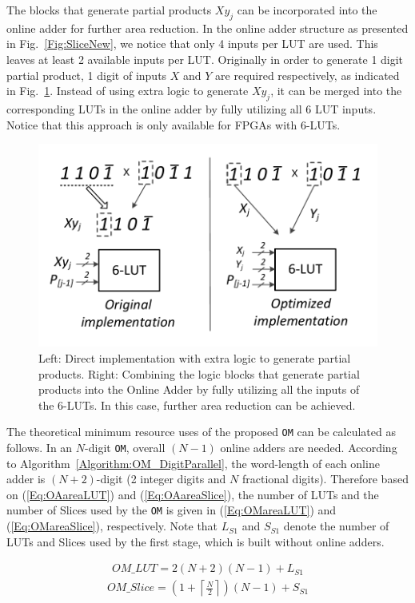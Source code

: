 \documentclass[conference]{IEEEtran}
\begin{document}
The blocks that generate partial products $Xy_j$ can be incorporated into the online adder for further area reduction. In the online adder structure as presented in Fig.~\ref{Fig:SliceNew}, we notice that only 4 inputs per LUT are used. This leaves at least 2 available inputs per LUT. Originally in order to generate 1 digit partial product, 1 digit of inputs $X$ and $Y$ are required respectively, as indicated in Fig.~\ref{Fig:PartialProduct}. Instead of using extra logic to generate $Xy_j$, it can be merged into the corresponding LUTs in the online adder by fully utilizing all 6 LUT inputs. Notice that this approach is only available for FPGAs with 6-LUTs.
%
\begin{figure}[tbp]
	\centering
	\includegraphics[width=.4\textwidth]{./Figures/PartialProduct.pdf}
	\vspace{-1ex}
	\caption{Left: Direct implementation with extra logic to generate partial products. Right: Combining the logic blocks that generate partial products into the Online Adder by fully utilizing all the inputs of the 6-LUTs. In this case, further area reduction can be achieved.}
	\label{Fig:PartialProduct}
	\vspace{-1ex}
\end{figure}

The theoretical minimum resource uses of the proposed \texttt{OM} can be calculated as follows. In an $N$-digit \texttt{OM}, overall $(N-1)$ online adders are needed. According to Algorithm~\ref{Algorithm:OM_DigitParallel}, the word-length of each online adder is $(N+2)$-digit (2 integer digits and $N$ fractional digits). Therefore based on (\ref{Eq:OAareaLUT}) and (\ref{Eq:OAareaSlice}), the number of LUTs and the number of Slices used by the \texttt{OM} is given in (\ref{Eq:OMareaLUT}) and (\ref{Eq:OMareaSlice}), respectively. Note that $L_{S1}$ and $S_{S1}$ denote the number of LUTs and Slices used by the first stage, which is built without online adders.

\begin{eqnarray}\label{Eq:OMareaLUT}
	OM\_{LUT} = 2(N+2)(N-1) + {L}_{S1}
\end{eqnarray}
%
\begin{eqnarray}\label{Eq:OMareaSlice}
	OM\_{Slice} = (1+\left\lceil{\frac{N}{2}}\right\rceil)(N-1)+S_{S1}
\end{eqnarray}
\end{document}
